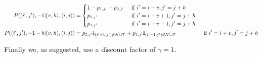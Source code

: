 \documentclass{article}[12pt]
\begin{document}
\begin{align}
P((i',j'), -1 | (v,h), (i,j)) &= \begin{cases} 1-p_{1,j'}-p_{2,j'} &\text{ if $i' = i+v, j' = j+h$}\\
p_{2,j'} & \text{ if $ i' = i+v+1, j' = j+h$}\\
p_{1,j'} & \text{ if $ i' = i+v-1, j' = j+h$}\end{cases}\\
P((i',j'),-1 -b | (v,h), (i,j))& =  p_{2,j'}\mathbb{I}_{(i'+1,j') \not\in \mathcal{N}\cup\mathcal{T}}+p_{1,j'}\mathbb{I}_{(i'-1,j') \not\in \mathcal{N}\cup\mathcal{T}} & \text{ if $i' = i+v, j' = j+h$}\\
\end{align}

Finally we, as suggested, use a discount factor of $\gamma = 1$.
\end{document}
